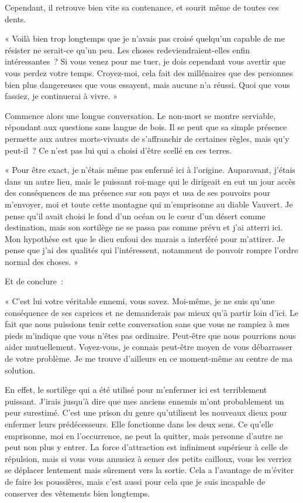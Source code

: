 \documentclass{report}
\begin{document}
Cependant, il retrouve bien vite sa contenance, et sourit même de toutes ces dents.

« Voilà bien trop longtemps que je n'avais pas croisé quelqu'un capable de me résister ne serait-ce qu'un peu. Les choses redeviendraient-elles enfin intéressantes ? Si vous venez pour me tuer, je dois cependant vous avertir que vous perdez votre temps. Croyez-moi, cela fait des millénaires que des personnes bien plus dangereuses que vous essayent, mais aucune n'a réussi. Quoi que vous fassiez, je continuerai à vivre. »

Commence alors une longue conversation. Le non-mort se montre serviable, répondant aux questions sans langue de bois. Il se peut que sa simple présence permette aux autres morts-vivants de s'affranchir de certaines règles, mais qu'y peut-il ? Ce n'est pas lui qui a choisi d'être scellé en ces terres.

« Pour être exact, je n'étais même pas enfermé ici à l'origine. Auparavant, j'étais dans un autre lieu, mais le puissant roi-mage qui le dirigeait en eut un jour accès des conséquences de ma présence sur son pays et usa de ses pouvoirs pour m'envoyer, moi et toute cette montagne qui m'emprisonne au diable Vauvert. Je pense qu'il avait choisi le fond d'un océan ou le cœur d'un désert comme destination, mais son sortilège ne se passa pas comme prévu et j'ai atterri ici. Mon hypothèse est que le dieu enfoui des marais a interféré pour m'attirer. Je pense que j'ai des qualités qui l'intéressent, notamment de pouvoir rompre l'ordre normal des choses. »

Et de conclure :

« C'est lui votre véritable ennemi, vous savez. Moi-même, je ne suis qu'une conséquence de ses caprices et ne demanderais pas mieux qu'à partir loin d'ici. Le fait que nous puissions tenir cette conversation sans que vous ne rampiez à mes pieds m'indique que vous n'êtes pas ordinaire. Peut-être que nous pourrions nous aider mutuellement. Voyez-vous, je connais peut-être moyen de vous débarrasser de votre problème. Je me trouve d'ailleurs en ce moment-même au centre de ma solution.

En effet, le sortilège qui a été utilisé pour m'enfermer ici est terriblement puissant. J'irais jusqu'à dire que mes anciens ennemis m'ont probablement un peur surestimé. C'est une prison du genre qu'utilisent les nouveaux dieux pour enfermer leurs prédécesseurs. Elle fonctionne dans les deux sens. Ce qu'elle emprisonne, moi en l’occurrence, ne peut la quitter, mais personne d'autre ne peut non plus y entrer. La force d'attraction est infiniment supérieur à celle de répulsion, mais si vous vous amusiez à semer des petits cailloux, vous les verriez se déplacer lentement mais sûrement vers la sortie. Cela a l'avantage de m'éviter de faire les poussières, mais c'est aussi pour cela que je suis incapable de conserver des vêtements bien longtemps.
\end{document}
